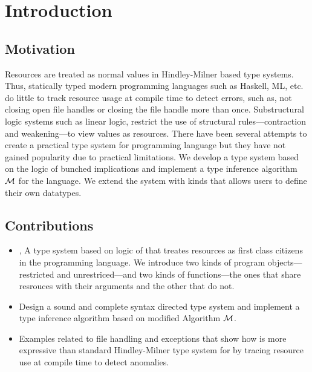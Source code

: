 \chapter{Introduction}
\section{Motivation}
Resources are treated as normal values in Hindley-Milner based type systems. Thus, statically typed modern programming languages such as
Haskell, ML, etc. do little to track resource usage at compile time to detect errors, such as, not closing open file handles
or closing the file handle more than once. Substructural logic systems such as linear logic, restrict the use of
structural rules---contraction and weakening---to view values as resources. There have been several attempts to create a practical
type system for programming language but they have not gained popularity due to practical limitations.
We develop a type system based on the logic of bunched implications and implement a type inference algorithm $\mathcal{M}$ for the language.
We extend the system with kinds that allows users to define their own datatypes.


\section{Contributions}
\begin{itemize}
\item \qub{}, A type system based on logic of \BI{} that treates resources as first class citizens in the programming language.
  We introduce two kinds of program objects---restricted and unrestriced---and two kinds of functions---the ones that share resrouces with
  their arguments and the other that do not.
\item Design a sound and complete syntax directed type system and implement a type inference algorithm based on modified Algorithm $\mathcal{M}$.
\item Examples related to file handling and exceptions that show how \qub{} is more expressive than standard
  Hindley-Milner type system for by tracing resource use at compile time to detect anomalies.
\end{itemize}